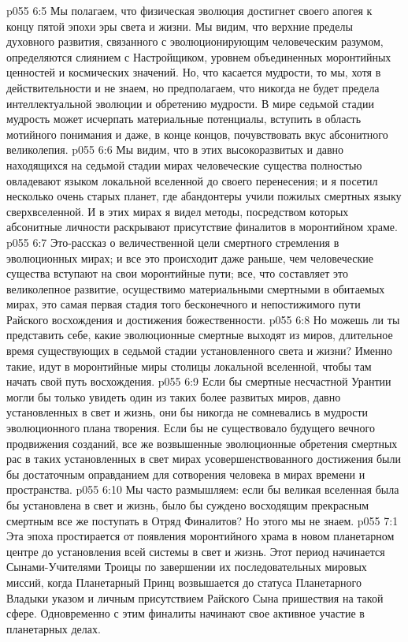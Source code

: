 \vs p055 6:5 Мы полагаем, что физическая эволюция достигнет своего апогея к концу пятой эпохи эры света и жизни. Мы видим, что верхние пределы духовного развития, связанного с эволюционирующим человеческим разумом, определяются слиянием с Настройщиком, уровнем объединенных моронтийных ценностей и космических значений. Но, что касается мудрости, то мы, хотя в действительности и не знаем, но предполагаем, что никогда не будет предела интеллектуальной эволюции и обретению мудрости. В мире седьмой стадии мудрость может исчерпать материальные потенциалы, вступить в область мотийного понимания и даже, в конце концов, почувствовать вкус абсонитного великолепия.
\vs p055 6:6 Мы видим, что в этих высокоразвитых и давно находящихся на седьмой стадии мирах человеческие существа полностью овладевают языком локальной вселенной до своего перенесения; и я посетил несколько очень старых планет, где абандонтеры учили пожилых смертных языку сверхвселенной. И в этих мирах я видел методы, посредством которых абсонитные личности раскрывают присутствие финалитов в моронтийном храме.
\vs p055 6:7 \pc Это\hyp{}рассказ о величественной цели смертного стремления в эволюционных мирах; и все это происходит даже раньше, чем человеческие существа вступают на свои моронтийные пути; все, что составляет это великолепное развитие, осуществимо материальными смертными в обитаемых мирах, это самая первая стадия того бесконечного и непостижимого пути Райского восхождения и достижения божественности.
\vs p055 6:8 Но можешь ли ты представить себе, какие эволюционные смертные выходят из миров, длительное время существующих в седьмой стадии установленного света и жизни? Именно такие, идут в моронтийные миры столицы локальной вселенной, чтобы там начать свой путь восхождения.
\vs p055 6:9 Если бы смертные несчастной Урантии могли бы только увидеть один из таких более развитых миров, давно установленных в свет и жизнь, они бы никогда не сомневались в мудрости эволюционного плана творения. Если бы не существовало будущего вечного продвижения созданий, все же возвышенные эволюционные обретения смертных рас в таких установленных в свет мирах усовершенствованного достижения были бы достаточным оправданием для сотворения человека в мирах времени и пространства.
\vs p055 6:10 Мы часто размышляем: если бы великая вселенная была бы установлена в свет и жизнь, было бы суждено восходящим прекрасным смертным все же поступать в Отряд Финалитов? Но этого мы не знаем.
\vs p055 7:1 Эта эпоха простирается от появления моронтийного храма в новом планетарном центре до установления всей системы в свет и жизнь. Этот период начинается Сынами\hyp{}Учителями Троицы по завершении их последовательных мировых миссий, когда Планетарный Принц возвышается до статуса Планетарного Владыки указом и личным присутствием Райского Сына пришествия на такой сфере. Одновременно с этим финалиты начинают свое активное участие в планетарных делах.
